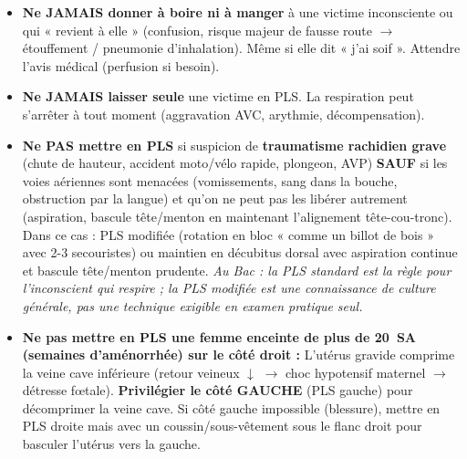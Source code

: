 \documentclass[11pt]{article}
\newcommand{\cle}[1]{{\popxbold\color{popdark}#1}}
\begin{document}
\begin{attention}
\begin{itemize}
    \item \textbf{Ne JAMAIS donner à boire ni à manger} à une victime inconsciente ou qui « revient à elle » (confusion, risque majeur de \cle{fausse route} $\rightarrow$ étouffement / pneumonie d'inhalation). Même si elle dit « j'ai soif ». Attendre l'avis médical (perfusion si besoin).
    \item \textbf{Ne JAMAIS laisser seule} une victime en PLS. La respiration peut s'arrêter à tout moment (aggravation AVC, arythmie, décompensation).
    \item \textbf{Ne PAS mettre en PLS} si suspicion de \textbf{traumatisme rachidien grave} (chute de hauteur, accident moto/vélo rapide, plongeon, AVP) \textbf{SAUF} si les voies aériennes sont menacées (vomissements, sang dans la bouche, obstruction par la langue) et qu'on ne peut pas les libérer autrement (aspiration, bascule tête/menton en maintenant l'alignement tête-cou-tronc). Dans ce cas : \cle{PLS modifiée} (rotation en bloc « comme un billot de bois » avec 2-3 secouristes) ou maintien en décubitus dorsal avec aspiration continue et bascule tête/menton prudente. \emph{Au Bac : la PLS standard est la règle pour l'inconscient qui respire ; la PLS modifiée est une connaissance de culture générale, pas une technique exigible en examen pratique seul.}
    \item \textbf{Ne pas mettre en PLS une femme enceinte de plus de \SI{20}{SA} (semaines d'aménorrhée) sur le côté droit :} L'utérus gravide comprime la \cle{veine cave inférieure} (retour veineux $\downarrow$ $\rightarrow$ choc hypotensif maternel $\rightarrow$ détresse fœtale). \textbf{Privilégier le côté GAUCHE} (PLS gauche) pour décomprimer la veine cave. Si côté gauche impossible (blessure), mettre en PLS droite mais avec un coussin/sous-vêtement sous le flanc droit pour basculer l'utérus vers la gauche.
\end{itemize}
\end{attention}
\end{document}
